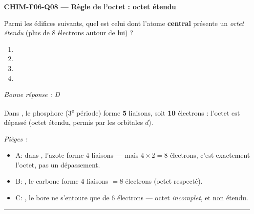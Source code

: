 \documentclass[11pt,a4paper]{article}
\begin{document}
\noindent\textbf{CHIM-F06-Q08 --- Règle de l'octet : octet étendu}\par
Parmi les édifices suivants, quel est celui dont l'atome \textbf{central} présente un \emph{octet
étendu} (plus de 8 électrons autour de lui) ?
\begin{enumerate}[label=\Alph*)]
\item {}
\item {}
\item {}
\item {}
\end{enumerate}
\textit{Bonne réponse : D}\par
Dans , le phosphore (3\textsuperscript{e} période) forme \textbf{5} liaisons, soit
\textbf{10} électrons : l'octet est dépassé (octet étendu, permis par les orbitales $d$).\par
\textit{Pièges :}
\begin{itemize}
\item A: dans , l'azote forme 4 liaisons --- mais $4\times2=8$ électrons, c'est exactement l'octet, pas un dépassement.
\item B: , le carbone forme 4 liaisons $=8$ électrons (octet respecté).
\item C: , le bore ne s'entoure que de 6 électrons --- octet \emph{incomplet}, et non étendu.
\end{itemize}
\vspace{8pt}\hrule\vspace{8pt}
\end{document}
